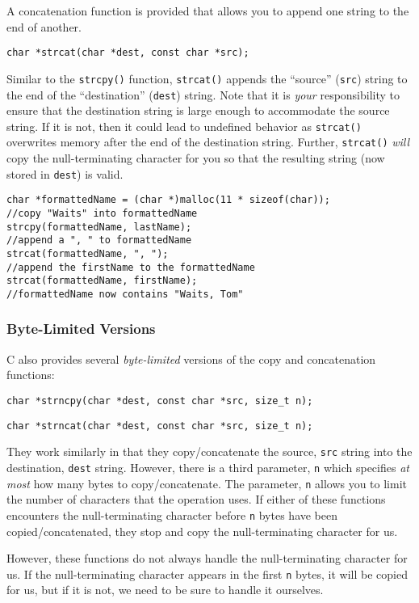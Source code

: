 A concatenation function is provided that allows you 
to append one string to the end of another.

\texttt{char *strcat(char *dest, const char *src);}

Similar to the \texttt{strcpy()} function, 
\texttt{strcat()} appends the ``source'' (\texttt{src})
string to the end of the ``destination'' (\texttt{dest})
string.  Note that it is \emph{your} responsibility to ensure
that the destination string is large enough to accommodate the
source string.  If it is not, then it could lead to undefined
behavior as \texttt{strcat()} overwrites memory after the
end of the destination string.  Further, \texttt{strcat()}
\emph{will} copy the null-terminating character for you so that
the resulting string (now stored in \texttt{dest}) is valid.

\begin{verbatim}
char *formattedName = (char *)malloc(11 * sizeof(char));
//copy "Waits" into formattedName
strcpy(formattedName, lastName);
//append a ", " to formattedName
strcat(formattedName, ", ");
//append the firstName to the formattedName
strcat(formattedName, firstName);
//formattedName now contains "Waits, Tom"
\end{verbatim}

\subsubsection{Byte-Limited Versions}

C also provides several \emph{byte-limited} versions of
the copy and concatenation functions:

\texttt{char *strncpy(char *dest, const char *src, size_t n);}

\texttt{char *strncat(char *dest, const char *src, size_t n);}

They work similarly in that they copy/concatenate the
source, \texttt{src} string into the destination,
\texttt{dest} string.  However, there is a third
parameter, \texttt{n} which specifies \emph{at
most} how many bytes to copy/concatenate.  The parameter, 
\texttt{n} allows you to limit the number of 
characters that the operation uses.  If either of
these functions encounters the null-terminating character
before \texttt{n} bytes have been copied/concatenated, 
they stop and copy the null-terminating character for us.

However, these functions do not always handle
the null-terminating character for us.  If the null-terminating
character appears in the first \texttt{n} bytes, 
it will be copied for us, but if it is not, we need to 
be sure to handle it ourselves.

